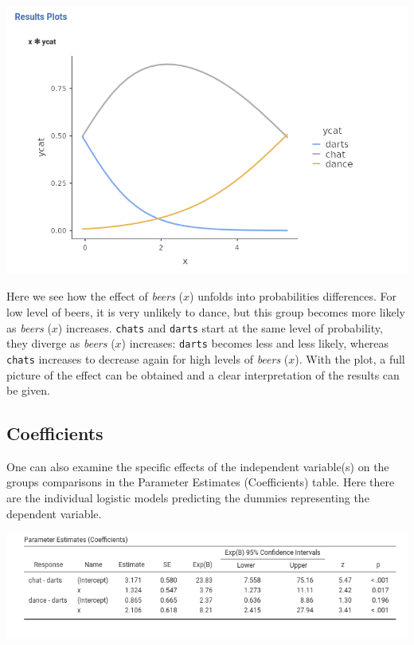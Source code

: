 \documentclass[
]{book}
\begin{document}
\includegraphics[width=9.9in]{bookletpics/3_multi_plot1}

Here we see how the effect of \emph{beers} (\(x\)) unfolds into probabilities differences. For low level of beers, it is very unlikely to dance, but this group becomes more likely as \emph{beers} (\(x\)) increases. \texttt{chats} and \texttt{darts} start at the same level of probability, they diverge as \emph{beers} (\(x\)) increases: \texttt{darts} becomes less and less likely, whereas \texttt{chats} increases to decrease again for high levels of \emph{beers} (\(x\)). With the plot, a full picture of the effect can be obtained and a clear interpretation of the results can be given.

\hypertarget{coefficients-2}{%
\subsection{Coefficients}\label{coefficients-2}}

One can also examine the specific effects of the independent variable(s) on the groups comparisons in the {Parameter Estimates (Coefficients)} table. Here there are the individual logistic models predicting the dummies representing the dependent variable.

\includegraphics[width=10.06in]{bookletpics/3_multi_output4}
\end{document}
